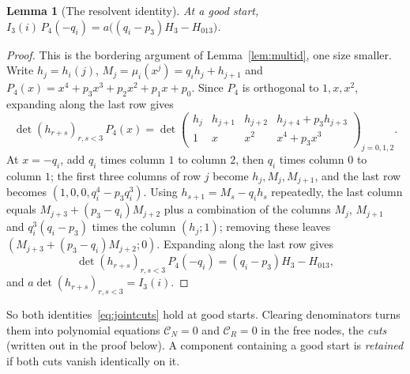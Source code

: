 \documentclass[11pt]{article}
\newtheorem{lemma}[theorem]{Lemma}
\theoremstyle{definition}
\theoremstyle{remark}
\begin{document}
\begin{lemma}[The resolvent identity]\label{lem:resolvent}
At a good start, $I_3(i)\,P_4(-q_i)=a\bigl((q_i-p_3)H_3-H_{013}\bigr)$.
\end{lemma}

\begin{proof}
This is the bordering argument of Lemma~\ref{lem:multid}, one size smaller.
Write $h_j=h_i(j)$, $M_j=\mu_i(x^j)=q_ih_j+h_{j+1}$ and
$P_4(x)=x^4+p_3x^3+p_2x^2+p_1x+p_0$. Since $P_4$ is orthogonal to $1,x,x^2$,
expanding along the last row gives
\[
 \det(h_{r+s})_{r,s<3}\,P_4(x)=
 \det\begin{pmatrix}
 h_j&h_{j+1}&h_{j+2}&h_{j+4}+p_3h_{j+3}\\
 1&x&x^2&x^4+p_3x^3
 \end{pmatrix}_{j=0,1,2}.
\]
At $x=-q_i$, add $q_i$ times column $1$ to column $2$, then $q_i$ times
column $0$ to column $1$; the first three columns of row $j$ become
$h_j,M_j,M_{j+1}$, and the last row becomes $(1,0,0,q_i^4-p_3q_i^3)$. Using
$h_{s+1}=M_s-q_ih_s$ repeatedly, the last column equals
$M_{j+3}+(p_3-q_i)M_{j+2}$ plus a combination of the columns $M_j$, $M_{j+1}$
and $q_i^3(q_i-p_3)$ times the column $(h_j;1)$; removing these leaves
$(M_{j+3}+(p_3-q_i)M_{j+2};0)$. Expanding along the last row gives
\[
 \det(h_{r+s})_{r,s<3}\,P_4(-q_i)=(q_i-p_3)H_3-H_{013},
\]
and $a\det(h_{r+s})_{r,s<3}=I_3(i)$.
\end{proof}

So both identities~\eqref{eq:jointcuts} hold at good starts. Clearing
denominators turns them into polynomial equations $\mathcal C_N=0$ and
$\mathcal C_R=0$ in the free nodes, the \emph{cuts} (written out in the proof
below). A component containing a good start is \emph{retained} if both cuts
vanish identically on it.
\end{document}

